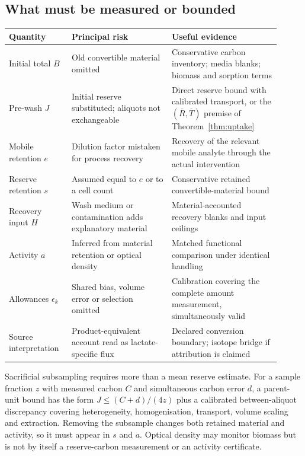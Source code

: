 \documentclass[11pt]{article}
\theoremstyle{plain}
\theoremstyle{definition}
\theoremstyle{remark}
\begin{document}
\subsection{What must be measured or bounded}

\begin{center}
\small
\begin{tabular}{>{\raggedright\arraybackslash}p{0.20\linewidth}%
                >{\raggedright\arraybackslash}p{0.34\linewidth}%
                >{\raggedright\arraybackslash}p{0.37\linewidth}}
\toprule
Quantity & Principal risk & Useful evidence\\
\midrule
Initial total $B$ & Old convertible material omitted
 & Conservative carbon inventory; media blanks; biomass and sorption terms\\
Pre-wash $J$ & Initial reserve substituted; aliquots not exchangeable
 & Direct reserve bound with calibrated transport, or the
   $(\overline R,\overline T)$ premise of Theorem~\ref{thm:uptake}\\
Mobile retention $e$ & Dilution factor mistaken for process recovery
 & Recovery of the relevant mobile analyte through the actual intervention\\
Reserve retention $s$ & Assumed equal to $e$ or to a cell count
 & Conservative retained convertible-material bound\\
Recovery input $H$ & Wash medium or contamination adds explanatory material
 & Material-accounted recovery blanks and input ceilings\\
Activity $a$ & Inferred from material retention or optical density
 & Matched functional comparison under identical handling\\
Allowances $\epsilon_k$ & Shared bias, volume error or selection omitted
 & Calibration covering the complete amount measurement, simultaneously valid\\
Source interpretation & Product-equivalent account read as lactate-specific flux
 & Declared conversion boundary; isotope bridge if attribution is claimed\\
\bottomrule
\end{tabular}
\end{center}

Sacrificial subsampling requires more than a mean reserve estimate. For a
sample fraction $z$ with measured carbon $C$ and simultaneous carbon error
$d$, a parent-unit bound has the form $J\le (C+d)/(4z)$ plus a calibrated
between-aliquot discrepancy covering heterogeneity, homogenisation, transport,
volume scaling and extraction. Removing the subsample changes both retained
material and activity, so it must appear in $s$ and $a$. Optical density may
monitor biomass but is not by itself a reserve-carbon measurement or an
activity certificate.
\end{document}
